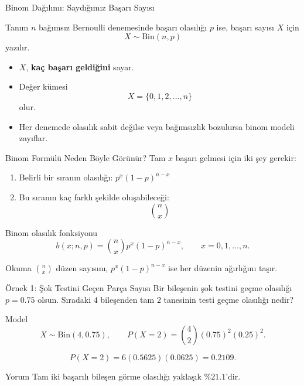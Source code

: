 \documentclass[light]{lutbeamer}
\begin{document}
\begin{frame}{Binom Dağılımı: Saydığımız Başarı Sayısı}
    \small
    \begin{block}{Tanım}
        \(n\) bağımsız Bernoulli denemesinde başarı olasılığı \(p\) ise,
        başarı sayısı \(X\) için
        \[
        X \sim \mathrm{Bin}(n,p)
        \]
        yazılır.
    \end{block}

    \begin{itemize}
        \item \(X\), \textbf{kaç başarı geldiğini} sayar.
        \item Değer kümesi
        \[
        X=\{0,1,2,\dots,n\}
        \]
        olur.
        \item Her denemede olasılık sabit değilse veya bağımsızlık bozulursa binom modeli zayıflar.
    \end{itemize}
\end{frame}

\begin{frame}{Binom Formülü Neden Böyle Görünür?}
    \small
    Tam \(x\) başarı gelmesi için iki şey gerekir:
    \begin{enumerate}
        \item Belirli bir sıranın olasılığı: \(p^x(1-p)^{n-x}\)
        \item Bu sıranın kaç farklı şekilde oluşabileceği:
        \[
        \binom{n}{x}
        \]
    \end{enumerate}

    \begin{block}{Binom olasılık fonksiyonu}
        \[
        b(x;n,p)=\binom{n}{x}p^x(1-p)^{n-x},
        \qquad x=0,1,\dots,n.
        \]
    \end{block}

    \begin{alertblock}{Okuma}
        \(\binom{n}{x}\) düzen sayısını, \(p^x(1-p)^{n-x}\) ise her düzenin ağırlığını taşır.
    \end{alertblock}
\end{frame}

\begin{frame}{Örnek 1: Şok Testini Geçen Parça Sayısı}
    \small
    Bir bileşenin şok testini geçme olasılığı \(p=0.75\) olsun. Sıradaki \(4\) bileşenden tam \(2\) tanesinin testi geçme olasılığı nedir?

    \vspace{0.2cm}
    \begin{block}{Model}
        \[
        X \sim \mathrm{Bin}(4,0.75), \qquad P(X=2)=\binom{4}{2}(0.75)^2(0.25)^2.
        \]
    \end{block}

    \[
    P(X=2)=6(0.5625)(0.0625)=0.2109.
    \]

    \begin{exampleblock}{Yorum}
        Tam iki başarılı bileşen görme olasılığı yaklaşık \(\%21.1\)'dir.
    \end{exampleblock}
\end{frame}
\end{document}
